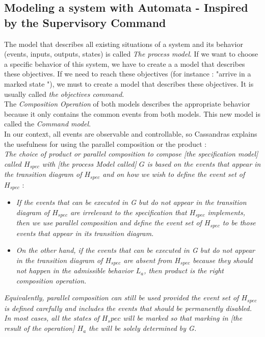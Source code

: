  \subsection{Modeling a system with Automata - Inspired by the Supervisory Command}
The model that describes all existing situations of a system and its behavior (events, inputs, outputs, states) is called \textit{The process model}. If we want to choose a specific behavior of this system, we have to create a a model that describes these objectives. If we need to reach these objectives (for instance : "arrive in a marked state "), we must to create a model that describes these objectives. It is usually called \textit{the objectives command}.\\
The \textit{Composition Operation} of both models describes the appropriate behavior because it only contains the common events from both models. This new model is called the \textit{Command model}.\\
In our context, all events are observable and controllable, so Cassandras explains the usefulness for using the parallel composition or the product :\\
\textit{The choice of product or parallel composition to compose [the specification model] called $H_{spec}$ with [the process Model called] $G$ is based on the events that appear in the transition diagram of $H_{spec}$ and on how we wish to define the event set of $H_{spec}$} :
\begin{itemize}
\item \textit{ If the events that can be executed in G but do not appear in the transition diagram of $H_{spec}$ are irrelevant to the specification that $H_{spec}$ implements, then we use parallel composition and define the event set of $H_{spec}$ to be those events that appear in its transition diagram.}
\item \textit{ On the other hand, if the events that can be executed in G but do not appear in the transition diagram of $H_{spec}$ are absent from $H_{spec}$ because they should not happen in the admissible behavior $L_a$, then product is the right composition operation.}
\end{itemize}
\textit{ Equivalently, parallel composition can still be used provided the event set of $H_{spec}$ is defined carefully and includes the events that should be permanently disabled.\\
 In most cases, all the states of $H_spec$ will be marked so that marking in [the result of the operation] $H_a$ the will be solely determined by G.}
 
